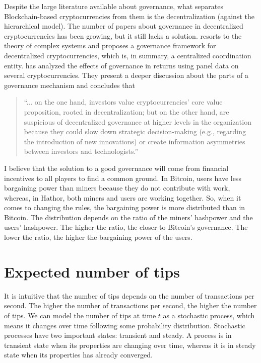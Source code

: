 Despite the large literature available about governance, what separates Blockchain-based cryptocurrencies from them is the decentralization (against the hierarchical model). The number of papers about governance in decentralized cryptocurrencies has been growing, but it still lacks a solution. \citet{hacker2017corporate} resorts to the theory of complex systems and proposes a governance framework for decentralized cryptocurrencies, which is, in summary, a centralized coordination entity. \citet{hsieh2017internal} has analyzed the effects of governance in returns using panel data on several cryptocurrencies. They present a deeper discussion about the parts of a governance mechanism and concludes that

\begin{quote}
``... on the one hand, investors value cryptocurrencies’ core value proposition, rooted in decentralization; but on the other hand, are suspicious of decentralized governance at higher levels in the organization because they could slow down strategic decision-making (e.g., regarding the introduction of new innovations) or create information asymmetries between investors and technologists.''
\end{quote}

I believe that the solution to a good governance will come from financial incentives to all players to find a common ground. In Bitcoin, users have less bargaining power than miners because they do not contribute with work, whereas, in Hathor, both miners and users are working together. So, when it comes to changing the rules, the bargaining power is more distributed than in Bitcoin. The distribution depends on the ratio of the miners' hashpower and the users' hashpower. The higher the ratio, the closer to Bitcoin's governance. The lower the ratio, the higher the bargaining power of the users.


\section{Expected number of tips}

It is intuitive that the number of tips depends on the number of transactions per second. The higher the number of transactions per second, the higher the number of tips. We can model the number of tips at time $t$ as a stochastic process, which means it changes over time following some probability distribution. Stochastic processes have two important states: transient and steady. A process is in transient state when its properties are changing over time, whereas it is in steady state when its properties has already converged.

